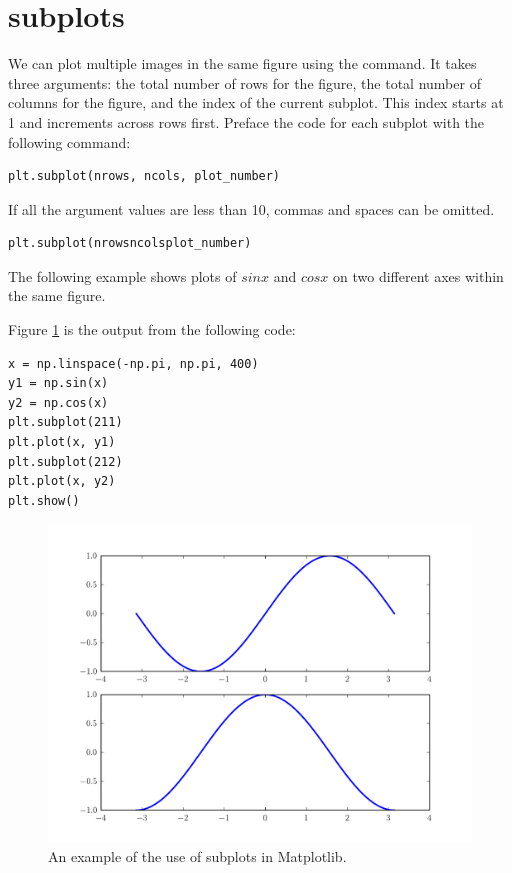 \section*{subplots}

We can plot multiple images in the same figure using the  command. 
It takes three arguments: the total number of rows for the figure, the total number of columns for the figure, and the index of the current subplot. 
This index starts at 1 and increments across rows first. 
Preface the code for each subplot with the following command:
\begin{lstlisting}
plt.subplot(nrows, ncols, plot_number)
\end{lstlisting}
If all the argument values are less than 10, commas and spaces can be 
omitted. 
\begin{lstlisting}
plt.subplot(nrowsncolsplot_number)
\end{lstlisting} 

The following example shows plots of $sin x$ and $cos x$ on two 
different axes within the same figure.

Figure \ref{fig:subplots} is the output from the following code:
\begin{lstlisting}
x = np.linspace(-np.pi, np.pi, 400) 
y1 = np.sin(x) 
y2 = np.cos(x)
plt.subplot(211) 
plt.plot(x, y1) 
plt.subplot(212) 
plt.plot(x, y2)
plt.show() 
\end{lstlisting}

\begin{figure} 
\includegraphics[width=\textwidth]{subplots.pdf}
\caption{An example of the use of subplots in Matplotlib.}
\label{fig:subplots} 
\end{figure}

